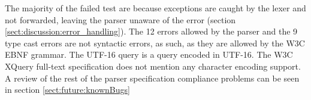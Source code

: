 The majority of the failed test are because exceptions are caught by the lexer
and not forwarded, leaving the parser unaware of the error (section
\ref{sect:discussion:error_handling}). The 12 errors allowed by the parser and
the 9 type cast errors are not syntactic errors, as such, as they are allowed
by the W3C EBNF grammar. The UTF-16 query is a query encoded in UTF-16. The W3C
XQuery full-text specification does not mention any character encoding support. A review of the rest of the parser specification compliance problems can be seen in section \ref{sect:future:knownBugs} 
